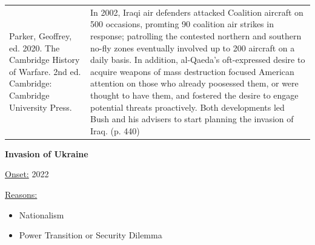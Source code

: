 {\begin{longtable}{p{}p{}}
\\
Parker, Geoffrey, ed. 2020. The Cambridge History of Warfare. 2nd ed. Cambridge: Cambridge University Press. & In 2002, Iraqi air defenders attacked Coalition aircraft on 500 occasions, promting 90 coalition air strikes in response; patrolling the contested northern and southern no-fly zones eventually involved up to 200 aircraft on a daily basis. In addition, al-Qaeda's oft-expressed desire to acquire weapons of mass destruction focused American attention on those who already poosessed them, or were thought to have them, and fostered the desire to engage potential threats proactively. Both developments led Bush and his advisers to start planning the invasion of Iraq. (p. 440)
\\
\end{longtable}}
\clearpage
         \textbf{Invasion of Ukraine} 

          \underline{Onset:} 2022         

\underline{Reasons:}
\begin{itemize}
\item Nationalism
\item Power Transition or Security Dilemma
\end{itemize}

